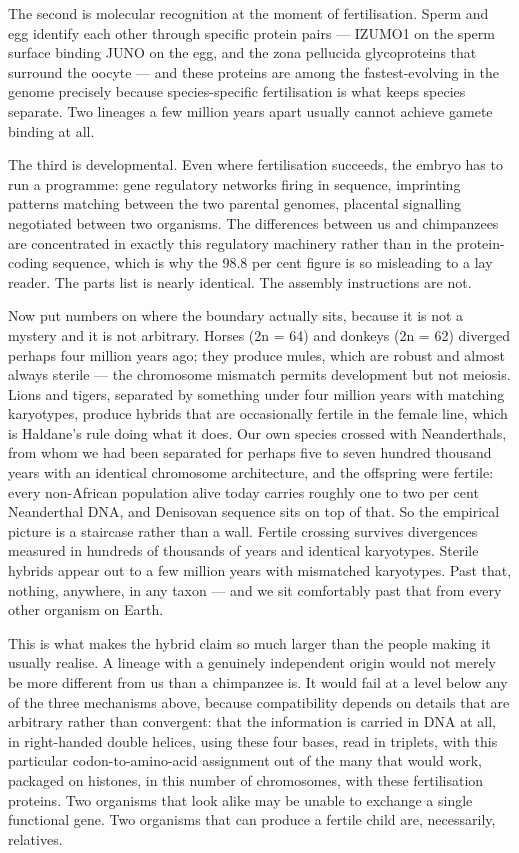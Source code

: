 The second is molecular recognition at the moment of fertilisation. Sperm and egg identify each
other through specific protein pairs --- IZUMO1 on the sperm surface binding JUNO on the egg, and
the zona pellucida glycoproteins that surround the oocyte --- and these proteins are among the
fastest-evolving in the genome precisely because species-specific fertilisation is what keeps
species separate. Two lineages a few million years apart usually cannot achieve gamete binding at
all.

The third is developmental. Even where fertilisation succeeds, the embryo has to run a programme:
gene regulatory networks firing in sequence, imprinting patterns matching between the two parental
genomes, placental signalling negotiated between two organisms. The differences between us and
chimpanzees are concentrated in exactly this regulatory machinery rather than in the protein-coding
sequence, which is why the 98.8 per cent figure is so misleading to a lay reader. The parts list is
nearly identical. The assembly instructions are not.

Now put numbers on where the boundary actually sits, because it is not a mystery and it is not
arbitrary. Horses (2n = 64) and donkeys (2n = 62) diverged perhaps four million years ago; they
produce mules, which are robust and almost always sterile --- the chromosome mismatch permits
development but not meiosis. Lions and tigers, separated by something under four million years with
matching karyotypes, produce hybrids that are occasionally fertile in the female line, which is
Haldane's rule doing what it does. Our own species crossed with Neanderthals, from whom we had been
separated for perhaps five to seven hundred thousand years with an identical chromosome
architecture, and the offspring were fertile: every non-African population alive today carries
roughly one to two per cent Neanderthal DNA, and Denisovan sequence sits on top of that. So the
empirical picture is a staircase rather than a wall. Fertile crossing survives divergences measured
in hundreds of thousands of years and identical karyotypes. Sterile hybrids appear out to a few
million years with mismatched karyotypes. Past that, nothing, anywhere, in any taxon --- and we sit
comfortably past that from every other organism on Earth.

This is what makes the hybrid claim so much larger than the people making it usually realise. A
lineage with a genuinely independent origin would not merely be more different from us than a
chimpanzee is. It would fail at a level below any of the three mechanisms above, because
compatibility depends on details that are arbitrary rather than convergent: that the information is
carried in DNA at all, in right-handed double helices, using these four bases, read in triplets,
with this particular codon-to-amino-acid assignment out of the many that would work, packaged on
histones, in this number of chromosomes, with these fertilisation proteins.  Two organisms that look alike may be unable to exchange a
single functional gene. Two organisms that can produce a fertile child are, necessarily, relatives.

